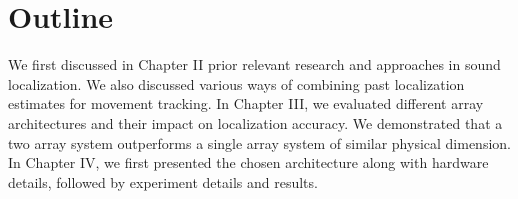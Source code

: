 \section{Outline}
We first discussed in Chapter II prior relevant research and approaches in sound localization. We also discussed various ways of combining past localization estimates for movement tracking. In Chapter III, we evaluated different array architectures and their impact on localization accuracy. We demonstrated that a two array system outperforms a single array system of similar physical dimension. In Chapter IV, we first presented the chosen architecture along with hardware details, followed by experiment details and results. 

